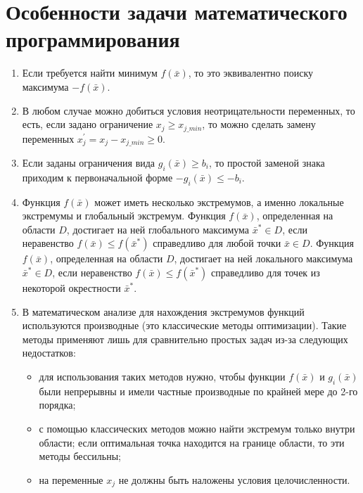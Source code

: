 \documentclass[a4paper,12pt]{report}
\begin{document}
\section{Особенности задачи математического программирования}
\begin{enumerate}
\item Если требуется найти минимум $f(\bar{x})$, то это эквивалентно поиску максимума $-f(\bar{x})$.
\item В любом случае можно добиться условия неотрицательности переменных, то есть, если задано ограничение $x_{j} \geq x_{j\_min}$, то можно сделать замену переменных $x^{'}_{j} = x_{j} - x_{j\_min} \geq 0$.
\item Если заданы ограничения вида $g_{i}(\bar{x}) \geq b_{i}$, то простой заменой знака приходим к первоначальной форме $-g_{i}(\bar{x}) \leq -b_{i}$.
\item Функция $f(\bar{x})$ может иметь несколько экстремумов, а именно локальные экстремумы и глобальный экстремум. Функция $f(\bar{x})$, определенная на области $D$, достигает на ней глобального максимума $\bar{x}^{*} \in D$, если неравенство $f(\bar{x}) \leq f(\bar{x}^{*})$ справедливо для любой точки $\bar{x} \in D$. Функция $f(\bar{x})$, определенная на области $D$, достигает на ней локального максимума $\bar{x}^{*} \in D$, если неравенство $f(\bar{x}) \leq f(\bar{x}^{*})$ справедливо для точек из некоторой окрестности $\bar{x}^{*}$.
\item В математическом анализе для нахождения экстремумов функций используются производные (это классические методы оптимизации). Такие методы применяют лишь для сравнительно простых задач из-за следующих недостатков:
\begin{itemize}
\item для использования таких методов нужно, чтобы функции $f(\bar{x})$ и $g_{i}(\bar{x})$ были непрерывны и имели частные производные по крайней мере до 2-го порядка;
\item с помощью классических методов можно найти экстремум только внутри области; если оптимальная точка находится на границе области, то эти методы бессильны;
\item на переменные $x_{j}$ не должны быть наложены условия целочисленности.
\end{itemize}
\end{enumerate}
\end{document}
